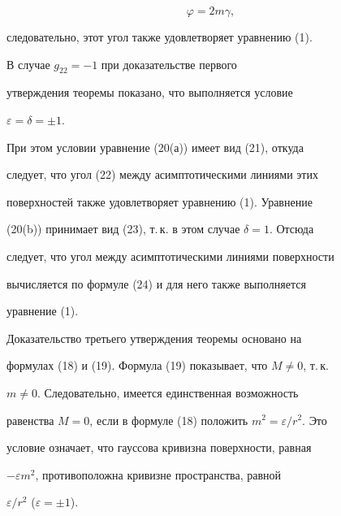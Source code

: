 \begin{equation}


\varphi=2m\gamma,


\end{equation}


следовательно, этот угол также удовлетворяет уравнению (1).





В случае $g_{22}=-1$ при доказательстве первого


утверждения теоремы показано, что выполняется условие 


$\varepsilon=\delta=\pm1$.


При этом условии уравнение (20(а)) имеет вид (21), откуда


следует, что угол (22) между асимптотическими линиями этих


поверхностей также удовлетворяет уравнению (1). Уравнение


(20(b)) принимает вид (23), т.\,к. в этом случае $\delta=1$. Отсюда


следует, что угол между асимптотическими линиями поверхности


вычисляется по формуле (24) и для него также выполняется


уравнение (1).





Доказательство третьего утверждения теоремы основано на


формулах (18) и (19). Формула (19) показывает, что $M\ne0$, т.\,к.


$m\ne0$. Следовательно, имеется единственная возможность


равенства $M=0$, если в формуле (18) положить $m^2=\varepsilon/r^2$. Это


условие означает, что гауссова кривизна поверхности, равная


$-\varepsilon m^2$, противоположна кривизне пространства, равной 


$\varepsilon/r^2$ ($\varepsilon=\pm1$).





